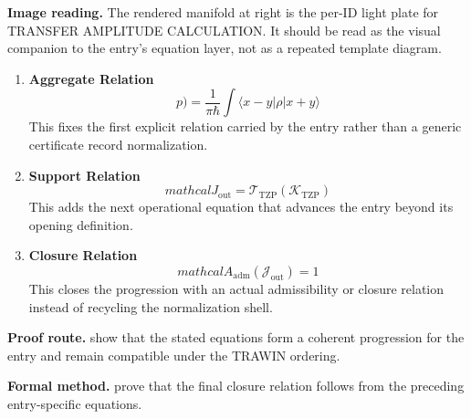 \begin{samepage}
\noindent\begin{minipage}[t]{0.45\linewidth}
\vspace{0pt}
\raggedright
\scriptsize\textbf{Image reading.} The rendered manifold at right is the per-ID light plate for TRANSFER AMPLITUDE CALCULATION. It should be read as the visual companion to the entry's equation layer, not as a repeated template diagram.\par
\end{minipage}\hfill
\begin{minipage}[t]{0.53\linewidth}
\vspace*{-0.10in}
\raggedright
{}
\end{minipage}
\end{samepage}

\clearpage


\begin{enumerate}[leftmargin=1.6em,itemsep=9pt,topsep=6pt]
\item \textbf{Aggregate Relation}
\[
p) = \frac{1}{\pi\hbar} \int \langle x-y|\rho\lvert x+y \rangle
\]
This fixes the first explicit relation carried by the entry rather than a generic certificate record normalization.

\item \textbf{Support Relation}
\[
mathcal{J}_{\mathrm{out}} = \mathcal{T}_{\mathrm{TZP}}\!\left(\mathcal{K}_{\mathrm{TZP}}\right)
\]
This adds the next operational equation that advances the entry beyond its opening definition.

\item \textbf{Closure Relation}
\[
mathcal{A}_{\mathrm{adm}}\!\left(\mathcal{J}_{\mathrm{out}}\right)=1
\]
This closes the progression with an actual admissibility or closure relation instead of recycling the normalization shell.
\end{enumerate}

\textbf{Proof route.} show that the stated equations form a coherent progression for the entry and remain compatible under the TRAWIN ordering.

\textbf{Formal method.} prove that the final closure relation follows from the preceding entry-specific equations.

\medskip
{}


